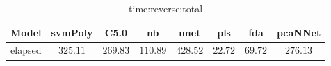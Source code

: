 \begin{table}[!ht]
	\centering
	\begin{tabular}{|c|c|c|c|c|c|c|c|}
		\hline
		Model & svmPoly & C5.0 & nb & nnet & pls & fda & pcaNNet \\ \hline
		elapsed & $325.11$ & $269.83$ & $110.89$ & $428.52$ & $22.72$ & $69.72$ & $276.13$ \\ \hline
	\end{tabular}
	\caption{time:reverse:total}
	\label{tab:time:reverse:total}
\end{table}
